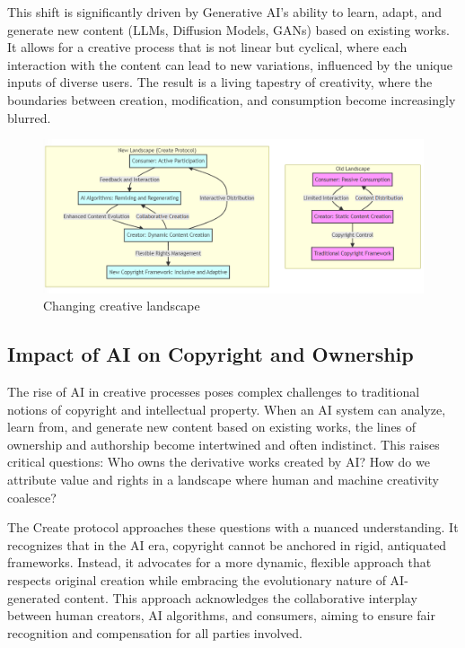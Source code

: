 \documentclass[12pt,a4paper]{article}
\begin{document}
This shift is significantly driven by Generative AI's ability to learn, adapt, and generate new content (LLMs, Diffusion Models, GANs) based on existing works. It allows for a creative process that is not linear but cyclical, where each interaction with the content can lead to new variations, influenced by the unique inputs of diverse users. The result is a living tapestry of creativity, where the boundaries between creation, modification, and consumption become increasingly blurred.


\begin{figure}[ht]
    \centering
    \includegraphics[width=1\linewidth]{create_1.png}
    \caption{Changing creative landscape}
    \label{fig:enter-label}
\end{figure}

\subsection{Impact of AI on Copyright and Ownership}

The rise of AI in creative processes poses complex challenges to traditional notions of copyright and intellectual property. When an AI system can analyze, learn from, and generate new content based on existing works, the lines of ownership and authorship become intertwined and often indistinct. This raises critical questions: Who owns the derivative works created by AI? How do we attribute value and rights in a landscape where human and machine creativity coalesce?

The Create protocol approaches these questions with a nuanced understanding. It recognizes that in the AI era, copyright cannot be anchored in rigid, antiquated frameworks. Instead, it advocates for a more dynamic, flexible approach that respects original creation while embracing the evolutionary nature of AI-generated content. This approach acknowledges the collaborative interplay between human creators, AI algorithms, and consumers, aiming to ensure fair recognition and compensation for all parties involved.
\end{document}
